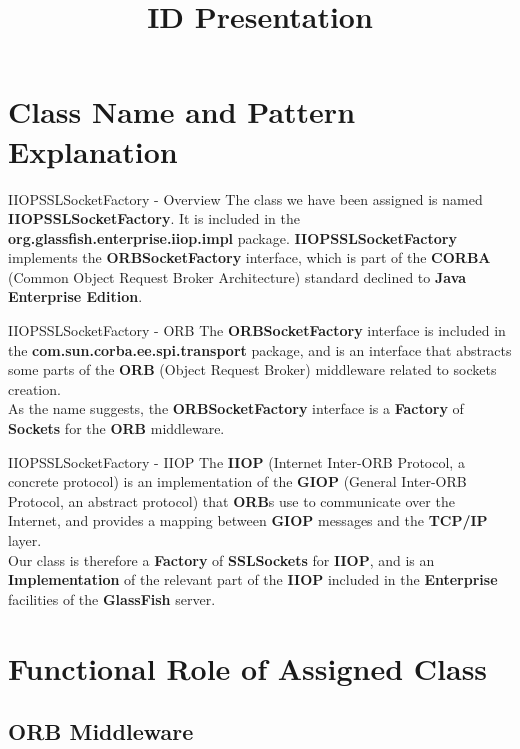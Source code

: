 \documentclass{../common/latex_classes/pdf_presentation}
\title{ID Presentation}
\begin{document}
	\titleToc{}
		\section{Class Name and Pattern Explanation}
		
		\begin{frame}{IIOPSSLSocketFactory - Overview}
			The class we have been assigned is named \textbf{IIOPSSLSocketFactory}.
			It is included in the \textbf{org.glassfish.enterprise.iiop.impl} package.
			\textbf{IIOPSSLSocketFactory} implements the \textbf{ORBSocketFactory} interface, which is part of the \textbf{CORBA} (Common Object Request Broker Architecture) standard declined to \textbf{Java Enterprise Edition}.
		\end{frame}
		
		\begin{frame}{IIOPSSLSocketFactory - ORB}
			The \textbf{ORBSocketFactory} interface is included in the \textbf{com.sun.corba.ee.spi.transport} package, and is an interface that abstracts some parts of the \textbf{ORB} (Object Request Broker) middleware related to sockets creation.\\
			As the name suggests, the \textbf{ORBSocketFactory} interface is a \textbf{Factory} of \textbf{Sockets} for the \textbf{ORB} middleware.
		\end{frame}
		
		\begin{frame}{IIOPSSLSocketFactory - IIOP}
			The \textbf{IIOP} (Internet Inter-ORB Protocol, a concrete protocol) is an implementation of the \textbf{GIOP} (General Inter-ORB Protocol, an abstract protocol) that \textbf{ORB}s use to communicate over the Internet, and provides a mapping between \textbf{GIOP} messages and the \textbf{TCP/IP} layer.\\
			Our class is therefore a \textbf{Factory} of \textbf{SSLSockets} for \textbf{IIOP}, and is an \textbf{Implementation} of the relevant part of the \textbf{IIOP} included in the \textbf{Enterprise} facilities of the \textbf{GlassFish} server.
		\end{frame}
		
		\section{Functional Role of Assigned Class}
		
		\subsection{ORB Middleware}
		
\end{document}
